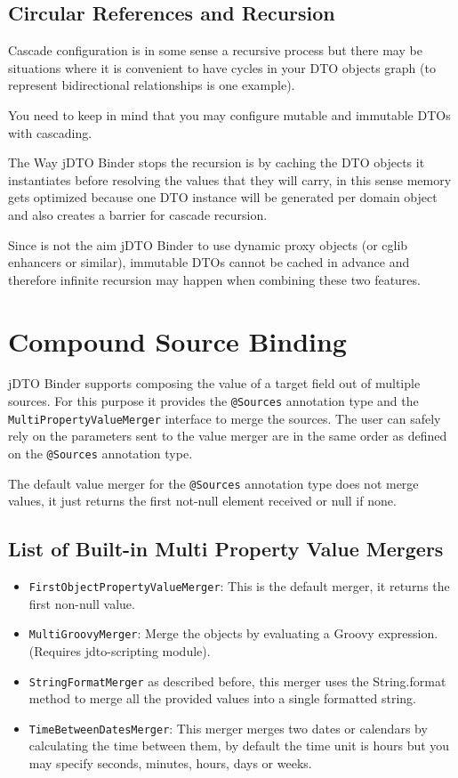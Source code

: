 \documentclass[11pt]{article}
\newcommand{\JDTO}{jDTO Binder\xspace}
\begin{document}
\subsection{Circular References and Recursion}

Cascade configuration is in some sense a recursive process but there may be situations where it is convenient to have cycles in your DTO objects graph (to represent bidirectional relationships is one example). 

You need to keep in mind that you may configure mutable and immutable DTOs with cascading.

The Way \JDTO stops the recursion is by caching the DTO objects it instantiates before resolving the values that they will carry, in this sense memory gets optimized because one DTO instance will be generated per domain object and also creates a barrier for cascade recursion.

Since is not the aim \JDTO to use dynamic proxy objects (or cglib enhancers or similar), immutable DTOs cannot be cached in advance and therefore infinite recursion may happen when combining these two features.


\clearpage

\section{Compound Source Binding}

\JDTO supports composing the value of a target field out of multiple sources. For this purpose it provides the \texttt{@Sources} annotation type and the \texttt{MultiPropertyValueMerger} interface to merge the sources.
The user can safely rely on the parameters sent to the value merger are in the same order as defined on the \texttt{@Sources} annotation type.

The default value merger for the \texttt{@Sources} annotation type does not merge values, it just returns the first not-null element received or null if none.

\subsection{List of Built-in Multi Property Value Mergers}

\begin{itemize}
 \item \texttt{FirstObjectPropertyValueMerger}: This is the default merger, it returns the first non-null value.
 \item \texttt{MultiGroovyMerger}: Merge the objects by evaluating a Groovy expression. (Requires jdto-scripting module).
 \item \texttt{StringFormatMerger} as described before, this merger uses the String.format method to merge all the provided values into a single formatted string.
 \item \texttt{TimeBetweenDatesMerger}: This merger merges two dates or calendars by calculating the time between them, by default the time unit is hours but you may specify seconds, minutes, hours, days or weeks.
\end{itemize}
\end{document}
